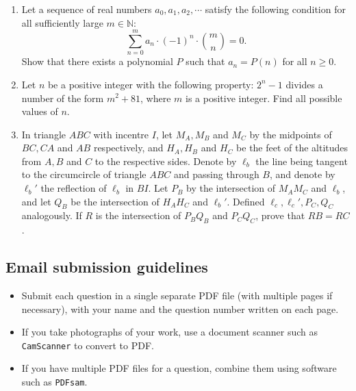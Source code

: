 \documentclass[11pt]{article}
\begin{document}
\begin{enumerate}
\item %
Let a sequence of real numbers $a_0, a_1,a_2, \cdots$ satisfy the following condition for all sufficiently large $m\in\mathbb{N}$: $$\sum_{n=0}^ma_n\cdot(-1)^n\cdot{m\choose n} = 0.$$ Show that there exists a polynomial $P$ such that $a_n = P(n)$ for all $n\geq 0$.


\item %
Let $n$ be a positive integer with the following property: $2^n-1$ divides a number of the form $m^2+81$, where $m$ is a positive integer. Find all possible values of $n$.


\item %
In triangle $ABC$ with incentre $I$, let $M_A,M_B$ and $M_C$ by the midpoints of $BC, CA$ and $AB$ respectively, and $H_A,H_B$ and $H_C$ be the feet of the altitudes from $A,B$ and $C$ to the respective sides. Denote by $\ell_b$ the line being tangent to the circumcircle of triangle $ABC$ and passing through $B$, and denote by $\ell_b'$ the reflection of $\ell_b$ in $BI$. Let $P_B$ by the intersection of $M_AM_C$ and $\ell_b$, and let $Q_B$ be the intersection of $H_AH_C$ and $\ell_b'$. Defined $\ell_c,\ell_c',P_C,Q_C$ analogously. If $R$ is the intersection of $P_BQ_B$ and $P_CQ_C$, prove that $RB = RC$.

\end{enumerate}


\small
\subsection*{Email submission guidelines}

\begin{itemize}
\item Submit each question in a single separate PDF file (with multiple pages if necessary), with your name and the question number written on each page.
\item If you take photographs of your work, use a document scanner such as \verb!CamScanner! to convert to PDF.
\item If you have multiple PDF files for a question, combine them using software such as \verb!PDFsam!.
\end{itemize}
\end{document}
